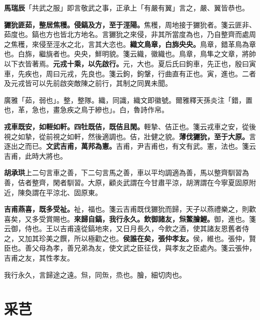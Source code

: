 \begin{quoting}\textbf{馬瑞辰}「共武之服」即言敬武之事，正承上「有嚴有翼」言之，嚴、翼皆恭也。\end{quoting}

\textbf{玁狁匪茹，整居焦穫。侵鎬及方，至于涇陽。}{\footnotesize 焦穫，周地接于玁狁者。箋云匪非、茹度也。鎬也方也皆北方地名。言玁狁之來侵，非其所當度為也，乃自整齊而處周之焦穫，來侵至涇水之北，言其大恣也。}\textbf{織文鳥章，白旆央央。}{\footnotesize 鳥章，錯革鳥為章也。白旆，繼旐者也。央央，鮮明貌。箋云織，徽織也。鳥章，鳥隼之文章，將帥以下衣皆著焉。}\textbf{元戎十乘，以先啟行。}{\footnotesize 元，大也。夏后氏曰鉤車，先正也，殷曰寅車，先疾也，周曰元戎，先良也。箋云鉤，鉤鞶，行曲直有正也。寅，進也。二者及元戎皆可以先前啟突敵陳之前行，其制之同異未聞。}

\begin{quoting}廣雅「茹，弱也」。整，整隊。織，同識，織文即徽號。爾雅釋天孫炎注「錯，置也，革，急也，畫急疾之鳥于縿也」。白，魯詩作帛。\end{quoting}

\textbf{戎車既安，如輊如軒。四牡既佶，既佶且閑。}{\footnotesize 輊摯、佶正也。箋云戎車之安，從後視之如摯，從前視之如軒，然後適調也。佶，壯健之貌。}\textbf{薄伐玁狁，至于大原。}{\footnotesize 言逐出之而已。}\textbf{文武吉甫，萬邦為憲。}{\footnotesize 吉甫，尹吉甫也，有文有武。憲，法也。箋云吉甫，此時大將也。}

\begin{quoting}\textbf{胡承珙}上二句言車之善，下二句言馬之善，車以平均調適為善，馬以整齊馴習為善，佶者整齊，閑者馴習。大原，顧炎武謂在今甘肅平涼，胡渭謂在今寧夏固原附近，陳奐謂在平涼北、固原東。\end{quoting}

\textbf{吉甫燕喜，既多受祉。}{\footnotesize 祉，福也。箋云吉甫既伐玁狁而歸，天子以燕禮樂之，則歡喜矣，又多受賞賜也。}\textbf{來歸自鎬，我行永久。飲御諸友，炰鱉膾鯉。}{\footnotesize 御，進也。箋云御，侍也。王以吉甫遠從鎬地來，又日月長久，今飲之酒，使其諸友恩舊者侍之，又加其珍美之饌，所以極勸之也。}\textbf{侯誰在矣，張仲孝友。}{\footnotesize 侯，維也。張仲，賢臣也。善父母為孝，善兄弟為友，使文武之臣征伐，與孝友之臣處內。箋云張仲，吉甫之友，其性孝友。}

\begin{quoting}我行永久，言歸途之遠。炰，同缹，烝也。膾，細切肉也。\end{quoting}

\section{采芑}

